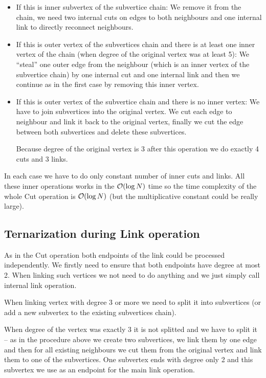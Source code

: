\begin{itemize}
\item {\I If this is inner subvertex of the subvertice chain:} We remove it
from the chain, we need two internal cuts on edges to both neighbours and one
internal link to directly reconnect neighbours.
\item {\I If this is outer vertex of the subvertices chain and there is at least
one inner vertex of the chain (when degree of the original vertex was
at least 5):} We ``steal'' one outer edge from the neighbour (which is
an inner vertex of the subvertice chain) by one internal cut and one internal
link and then we continue as in the first case by removing this inner vertex.
\item {\I If this is outer vertex of the subvertice chain and there is no inner
vertex:} We have to join subvertices into the original vertex. We cut each edge
to neighbour and link it back to the original vertex, finally we cut the edge
between both subvertices and delete these subvertices.

Because degree of the original vertex is 3 after this operation we do exactly
4 cuts and 3 links.
\end{itemize}

In each case we have to do only constant number of inner cuts and links. All
these inner operations works in the ${\cal O}(\log N)$ time so the time complexity of
the whole Cut operation is ${\cal O}(\log N)$ (but the multiplicative constant could
be really large).

\subsection{Ternarization during Link operation}

As in the Cut operation both endpoints of the link could be processed
independently. We firstly need to ensure that both endpoints have degree at
most 2. When linking such vertices we not need to do anything and we just simply
call internal link operation.

When linking vertex with degree 3 or more we need to split it into subvertices
(or add a new subvertex to the existing subvertices chain).

When degree of the vertex was exactly 3 it is not splitted and we have to split
it -- as in the procedure above we create two subvertices, we link them by one
edge and then for all existing neighbours we cut them from the original vertex
and link them to one of the subvertices. One subvertex ends with degree only
2 and this subvertex we use as an endpoint for the main link operation.

